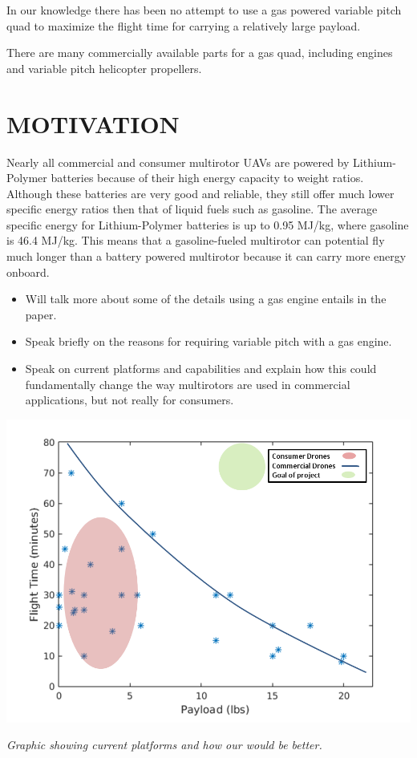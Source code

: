 \documentclass[letterpaper, 10 pt, conference]{ieeeconf}  %
\makeatletter
\newenvironment{figurehere}
  {\def\@captype{figure}}
  {}
\makeatother
\begin{document}
In our knowledge there has been no attempt to use a gas powered variable pitch quad to maximize the flight time for carrying a relatively large payload. 

There are many commercially available parts for a gas quad, including engines and variable pitch helicopter propellers. 

\section{MOTIVATION}

Nearly all commercial and consumer multirotor UAVs are powered by Lithium-Polymer batteries because of their high energy capacity to weight ratios. Although these batteries are very good and reliable, they still offer much lower specific energy ratios then that of liquid fuels such as gasoline. The average specific energy for Lithium-Polymer batteries is up to 0.95 MJ/kg, where gasoline is 46.4 MJ/kg. This means that a gasoline-fueled multirotor can potential fly much longer than a battery powered multirotor because it can carry more energy onboard. 

\begin{itemize}
	\item{Will talk more about some of the details using a gas engine entails in the paper.}
	\item{Speak briefly on the reasons for requiring variable pitch with a gas engine.} 
	\item{Speak on current platforms and capabilities and explain how this could fundamentally change the way multirotors are used in commercial applications, but not really for consumers.}
\end{itemize}


\begin{figurehere}
	\begin{center}
		\includegraphics[width=.40\textwidth]{current_capabilities.png}
		\caption{\textit{Graphic showing current platforms and how our would be better.}}
		\label{current_cap}
	\end{center}
\end{figurehere}
\end{document}
